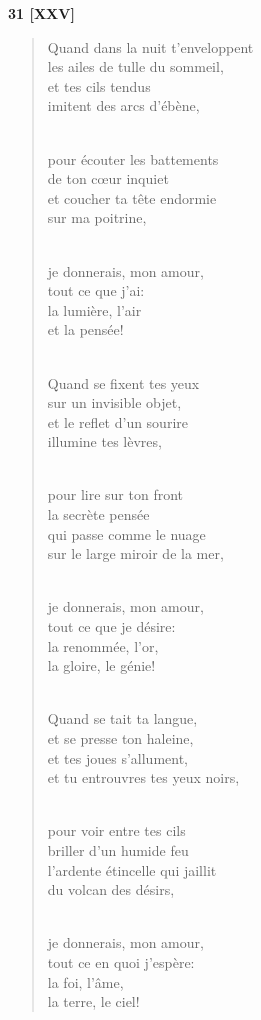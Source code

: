 \documentclass[a4paper,12pt]{book}
\begin{document}
\bigskip

\begin{center} {\bf 31 [XXV]} \end{center}

\begin{verse}
Quand dans la nuit t'enveloppent \\
les ailes de tulle du sommeil, \\
et tes cils tendus \\
imitent des arcs d'ébène, \\ \

pour écouter les battements \\
de ton c{\oe}ur inquiet \\
et coucher ta tête endormie \\
sur ma poitrine, \\ \

je donnerais, mon amour, \\
tout ce que j'ai: \\
la lumière, l'air \\
et la pensée! \\ \

Quand se fixent tes yeux \\
sur un invisible objet, \\
et le reflet d'un sourire \\
illumine tes lèvres, \\ \

pour lire sur ton front \\
la secrète pensée \\
qui passe comme le nuage \\
sur le large miroir de la mer, \\ \

je donnerais, mon amour, \\
tout ce que je désire: \\
la renommée, l'or, \\
la gloire, le génie! \\ \

Quand se tait ta langue, \\
et se presse ton haleine, \\
et tes joues s'allument, \\
et tu entrouvres tes yeux noirs, \\ \


pour voir entre tes cils \\
briller d'un humide feu \\
l'ardente étincelle qui jaillit \\
du volcan des désirs, \\ \

je donnerais, mon amour, \\
tout ce en quoi j'espère: \\
la foi, l'âme, \\
la terre, le ciel! \\
\end{verse}
\end{document}
